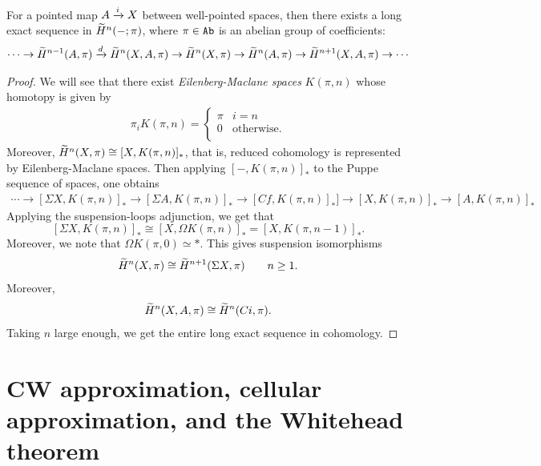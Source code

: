 \documentclass{article}[11pt]
\begin{document}
	\begin{proposition} For a pointed map $A\xrightarrow{i} X$ between well-pointed spaces, then there exists a long exact sequence in $\widetilde{H}^n(-; \pi)$, where $\pi\in\texttt{Ab}$ is an abelian group of coefficients:
	\begin{align*}
		\cdots \to \widetilde{H}^{n-1}(A,\pi) \xrightarrow{d} \widetilde{H}^n(X,A,\pi) \to \widetilde{H}^n (X,\pi) \to \widetilde{H}^n(A,\pi) \to \widetilde{H}^{n+1}(X,A,\pi)\to \cdots
	\end{align*}

	\end{proposition}
	\begin{proof} We will see that there exist \textit{Eilenberg-Maclane spaces} $K(\pi,n)$ whose homotopy is given by
	\begin{align*}
		\pi_i K(\pi,n) = \begin{cases} \pi & i=n \\ 0 & \text{otherwise}. \\ \end{cases}
	\end{align*}
	Moreover, $\widetilde{H}^n(X,\pi) \cong [X,K(\pi,n)]_\ast$, that is, reduced cohomology is represented by Eilenberg-Maclane spaces. Then applying $[-,K(\pi,n)]_\ast$ to the Puppe sequence of spaces, one obtains
	\begin{align*}
		\cdots \to [\Sigma X,K(\pi,n)]_\ast\to [\Sigma A, K(\pi,n)]_\ast \to [Cf,K(\pi,n)]_\ast] \to [X,K(\pi,n)]_\ast \to [A,K(\pi,n)]_\ast
	\end{align*}
	Applying the suspension-loops adjunction, we get that $$[\Sigma X, K(\pi,n)]_\ast \cong [X,\Omega K(\pi,n)]_\ast = [X,K(\pi,n-1)]_\ast.$$ Moreover, we note that $\Omega K(\pi,0) \simeq \ast$. This gives suspension isomorphisms
	\begin{align*}
		\widetilde{H}^n(X,\pi) \cong \widetilde{H}^{n+1}(\Sigma X, \pi) \quad \quad n\geq 1.
	\end{align*}
	Moreover,
	\begin{align*}
		\widetilde{H}^n (X,A,\pi) \cong \widetilde{H}^n (Ci, \pi).
	\end{align*}
	Taking $n$ large enough, we get the entire long exact sequence in cohomology.
	\end{proof}










\section{CW approximation, cellular approximation, and the Whitehead theorem}
\end{document}
